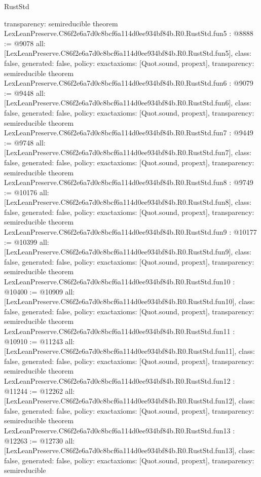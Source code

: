 \begin{lexlean}{RustStd}
\begin{coremodule}
{  transparency: semireducible
}
theorem LexLeanPreserve.C86f2e6a7d0c8bcf6a114d0ee934bf84b.R0.RustStd.fun5 : @8888 := @9078 {
  all: [LexLeanPreserve.C86f2e6a7d0c8bcf6a114d0ee934bf84b.R0.RustStd.fun5],
  class: false,
  generated: false,
  policy: exact{axioms: [Quot.sound, propext]},
  transparency: semireducible
}
theorem LexLeanPreserve.C86f2e6a7d0c8bcf6a114d0ee934bf84b.R0.RustStd.fun6 : @9079 := @9448 {
  all: [LexLeanPreserve.C86f2e6a7d0c8bcf6a114d0ee934bf84b.R0.RustStd.fun6],
  class: false,
  generated: false,
  policy: exact{axioms: [Quot.sound, propext]},
  transparency: semireducible
}
theorem LexLeanPreserve.C86f2e6a7d0c8bcf6a114d0ee934bf84b.R0.RustStd.fun7 : @9449 := @9748 {
  all: [LexLeanPreserve.C86f2e6a7d0c8bcf6a114d0ee934bf84b.R0.RustStd.fun7],
  class: false,
  generated: false,
  policy: exact{axioms: [Quot.sound, propext]},
  transparency: semireducible
}
theorem LexLeanPreserve.C86f2e6a7d0c8bcf6a114d0ee934bf84b.R0.RustStd.fun8 : @9749 := @10176 {
  all: [LexLeanPreserve.C86f2e6a7d0c8bcf6a114d0ee934bf84b.R0.RustStd.fun8],
  class: false,
  generated: false,
  policy: exact{axioms: [Quot.sound, propext]},
  transparency: semireducible
}
theorem LexLeanPreserve.C86f2e6a7d0c8bcf6a114d0ee934bf84b.R0.RustStd.fun9 : @10177 := @10399 {
  all: [LexLeanPreserve.C86f2e6a7d0c8bcf6a114d0ee934bf84b.R0.RustStd.fun9],
  class: false,
  generated: false,
  policy: exact{axioms: [Quot.sound, propext]},
  transparency: semireducible
}
theorem LexLeanPreserve.C86f2e6a7d0c8bcf6a114d0ee934bf84b.R0.RustStd.fun10 : @10400 := @10909 {
  all: [LexLeanPreserve.C86f2e6a7d0c8bcf6a114d0ee934bf84b.R0.RustStd.fun10],
  class: false,
  generated: false,
  policy: exact{axioms: [Quot.sound, propext]},
  transparency: semireducible
}
theorem LexLeanPreserve.C86f2e6a7d0c8bcf6a114d0ee934bf84b.R0.RustStd.fun11 : @10910 := @11243 {
  all: [LexLeanPreserve.C86f2e6a7d0c8bcf6a114d0ee934bf84b.R0.RustStd.fun11],
  class: false,
  generated: false,
  policy: exact{axioms: [Quot.sound, propext]},
  transparency: semireducible
}
theorem LexLeanPreserve.C86f2e6a7d0c8bcf6a114d0ee934bf84b.R0.RustStd.fun12 : @11244 := @12262 {
  all: [LexLeanPreserve.C86f2e6a7d0c8bcf6a114d0ee934bf84b.R0.RustStd.fun12],
  class: false,
  generated: false,
  policy: exact{axioms: [Quot.sound, propext]},
  transparency: semireducible
}
theorem LexLeanPreserve.C86f2e6a7d0c8bcf6a114d0ee934bf84b.R0.RustStd.fun13 : @12263 := @12730 {
  all: [LexLeanPreserve.C86f2e6a7d0c8bcf6a114d0ee934bf84b.R0.RustStd.fun13],
  class: false,
  generated: false,
  policy: exact{axioms: [Quot.sound, propext]},
  transparency: semireducible
}
\end{coremodule}
\end{lexlean}
